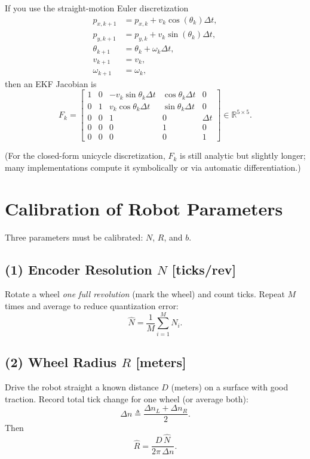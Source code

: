 \documentclass[11pt]{article}
\begin{document}
If you use the straight-motion Euler discretization
\begin{align*}
p_{x,k+1} &= p_{x,k} + v_k\cos(\theta_k)\Delta t,\\
p_{y,k+1} &= p_{y,k} + v_k\sin(\theta_k)\Delta t,\\
\theta_{k+1} &= \theta_k + \omega_k\Delta t,\\
v_{k+1} &= v_k,\\
\omega_{k+1} &= \omega_k,
\end{align*}
then an EKF Jacobian is
\begin{equation}
F_k =
\begin{bmatrix}
1 &0 &-v_k\sin\theta_k\Delta t &\cos\theta_k\Delta t &0 \\
0 &1 & v_k\cos\theta_k\Delta t &\sin\theta_k\Delta t &0 \\
0 &0 &1 &0 &\Delta t \\
0 &0 &0 &1 &0 \\
0 &0 &0 &0 &1
\end{bmatrix}
\in \mathbb{R}^{5\times5}.
\end{equation}

(For the closed-form unicycle discretization, $F_k$ is still analytic but slightly longer; many implementations compute it symbolically or via automatic differentiation.)

\section*{Calibration of Robot Parameters}

Three parameters must be calibrated: $N$, $R$, and $b$.

\subsection*{(1) Encoder Resolution $N$ [ticks/rev]}

Rotate a wheel \emph{one full revolution} (mark the wheel) and count ticks.
Repeat $M$ times and average to reduce quantization error:
\begin{equation}
\hat{N} = \frac{1}{M}\sum_{i=1}^{M} N_i.
\end{equation}

\subsection*{(2) Wheel Radius $R$ [meters]}

Drive the robot straight a known distance $D$ (meters) on a surface with good traction.
Record total tick change for one wheel (or average both):
\begin{equation}
\Delta n \triangleq \frac{\Delta n_L + \Delta n_R}{2}.
\end{equation}
Then
\begin{equation}
\hat{R} = \frac{D\,\hat{N}}{2\pi\,\Delta n}.
\end{equation}
\end{document}
